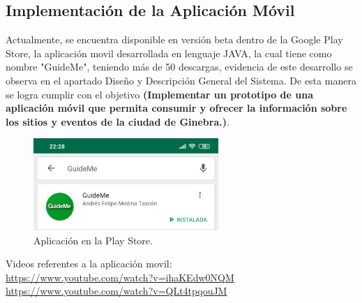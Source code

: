 \documentclass[12pt,letterpaper,openany]{book}
\begin{document}
\subsection{Implementación de la Aplicación Móvil}
Actualmente, se encuentra disponible en versión beta dentro de la Google Play Store, la aplicación movil desarrollada en lenguaje JAVA, la cual tiene como nombre "GuideMe",  teniendo más de 50 descargas, evidencia de este desarrollo se observa en el apartado Diseño y Descripción General del Sistema. De esta manera se logra cumplir con el objetivo \textbf{(Implementar un prototipo de una aplicación móvil que permita consumir y ofrecer la información sobre los sitios y eventos de la ciudad de Ginebra.)}.
\begin{figure}[H]
\begin{center}
\includegraphics[width=7cm]{./imagenes/gm}
\caption{Aplicación en la Play Store.}
\end{center}
\end{figure}
Videos referentes a la aplicación movil: \\
\url{https://www.youtube.com/watch?v=ihaKEdw0NQM}\\
\url{https://www.youtube.com/watch?v=QLt4tpqouJM}
\end{document}
